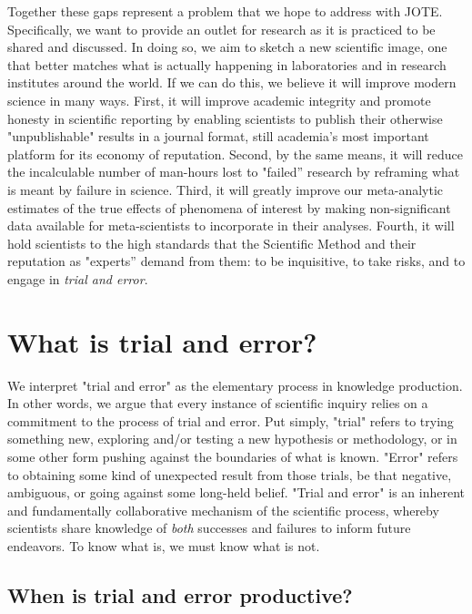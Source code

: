 \documentclass[twocolumn, serif, editorial, authordate]{jote-article}
\begin{document}
Together these gaps represent a problem that we hope to address with JOTE. Specifically, we want to provide an outlet for research as it is practiced to be shared and discussed. In doing so, we aim to sketch a new scientific image, one that better matches what is actually happening in laboratories and in research institutes around the world. If we can do this, we believe it will improve modern science in many ways. First, it will improve academic integrity and promote honesty in scientific reporting by enabling scientists to publish their otherwise "unpublishable" results in a journal format, still academia's most important platform for its economy of reputation. Second, by the same means, it will reduce the incalculable number of man-hours lost to "failed'' research by reframing what is meant by failure in science.
Third, it will greatly improve our meta-analytic estimates of the true effects of phenomena of interest by making non-significant data available for meta-scientists to incorporate in their analyses. Fourth, it will hold scientists to the high standards that the Scientific Method and their reputation as "experts'' demand from them: to be inquisitive, to take risks, and to engage in \emph{trial and error}.

 {} \section*{What is trial and error?}

We interpret "trial and error" as the elementary process in knowledge production. In other words, we argue that every instance of scientific inquiry relies on a commitment to the process of trial and error. Put simply, "trial" refers to trying something new, exploring and/or testing a new hypothesis or methodology, or in some other form pushing against the boundaries of what is known. "Error" refers to obtaining some kind of unexpected result from those trials, be that negative, ambiguous, or going against some long-held belief. "Trial and error" is an inherent and fundamentally collaborative mechanism of the scientific process, whereby scientists share knowledge of \emph{both} successes and failures to inform future endeavors. To know what is, we must know what is not.

 {} \subsection*{When is trial and error productive?}
\end{document}
